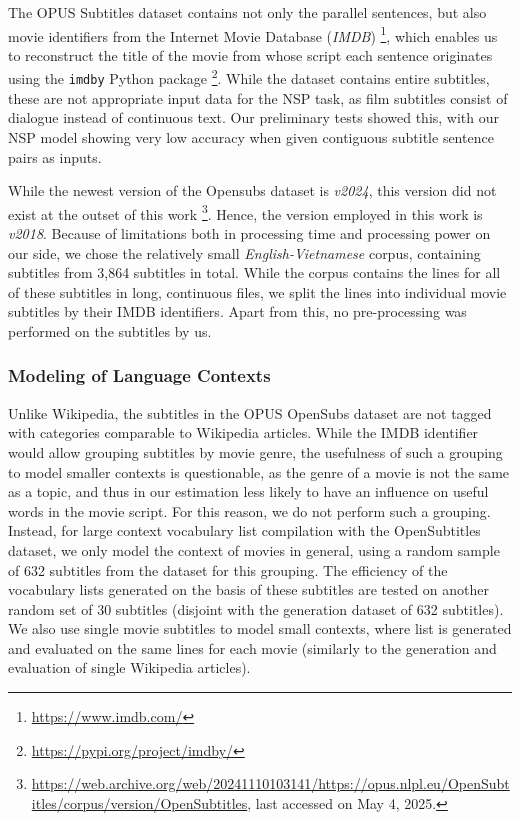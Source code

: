 The OPUS Subtitles dataset contains not only the parallel sentences, but also movie identifiers from the Internet Movie Database (\textit{IMDB}) \footnote{\url{https://www.imdb.com/}}, which enables us to reconstruct the title of the movie from whose script each sentence originates using the \texttt{imdby} Python package \footnote{\url{https://pypi.org/project/imdby/}}.
While the dataset contains entire subtitles, these are not appropriate input data for the NSP task, as film subtitles consist of dialogue instead of continuous text.
Our preliminary tests showed this, with our NSP model showing very low accuracy when given contiguous subtitle sentence pairs as inputs.

While the newest version of the Opensubs dataset is \textit{v2024}, this version did not exist at the outset of this work
\footnote{\url{https://web.archive.org/web/20241110103141/https://opus.nlpl.eu/OpenSubtitles/corpus/version/OpenSubtitles}, last accessed on May 4, 2025.}.
Hence, the version employed in this work is \textit{v2018}.
Because of limitations both in processing time and processing power on our side, we chose the relatively small \textit{English-Vietnamese} corpus, containing subtitles from 3,864 subtitles in total.
While the corpus contains the lines for all of these subtitles in long, continuous files, we split the lines into individual movie subtitles by their IMDB identifiers.
Apart from this, no pre-processing was performed on the subtitles by us.

\subsubsection{Modeling of Language Contexts}
Unlike Wikipedia, the subtitles in the OPUS OpenSubs dataset are not tagged with categories comparable to Wikipedia articles.
While the IMDB identifier would allow grouping subtitles by movie genre, the usefulness of such a grouping to model smaller contexts is questionable, as the genre of a movie is not the same as a topic, and thus in our estimation less likely to have an influence on useful words in the movie script.
For this reason, we do not perform such a grouping.
Instead, for large context vocabulary list compilation with the OpenSubtitles dataset, we only model the context of movies in general, using a random sample of 632 subtitles from the dataset for this grouping.
The efficiency of the vocabulary lists generated on the basis of these subtitles are tested on another random set of 30 subtitles (disjoint with the generation dataset of 632 subtitles).
We also use single movie subtitles to model small contexts, where list is generated and evaluated on the same lines for each movie (similarly to the generation and evaluation of single Wikipedia articles).

